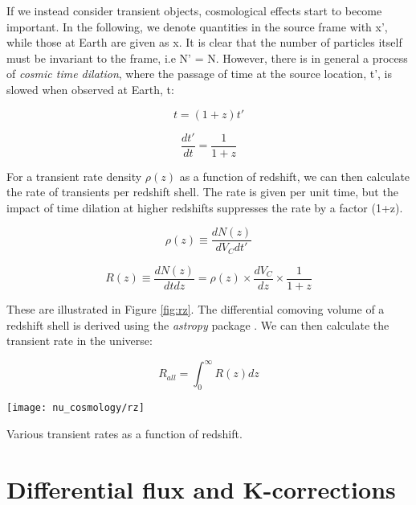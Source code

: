 If we instead consider transient objects, cosmological effects start to become important. In the following, we denote quantities in the source frame with x', while those at Earth are given as x. It is clear that the number of particles itself must be invariant to the frame, i.e N' = N. However, there is in general a process of \emph{cosmic time dilation}, where the passage of time at the source location, t', is slowed when observed at Earth, t:

\begin{equation}
t = (1+z)t'
\label{eq:t}
\end{equation}

\begin{equation}
\frac{dt'}{dt} = \frac{1}{1+z}
\label{eq:dt}
\end{equation}

For a transient rate density $\rho (z)$ as a function of redshift, we can then calculate the rate of transients per redshift shell. The rate is given per unit time, but the impact of time dilation at higher redshifts suppresses the rate by a factor (1+z). 

\begin{equation}
\rho(z) \equiv \frac{dN(z)}{dV_{C}dt'}
\end{equation}

\begin{equation}
R(z) \equiv \frac{dN(z)}{dtdz} = \rho(z) \times \frac{dV_{C}}{dz} \times \frac{1}{1+z}
\label{eq:transient_rate}
\end{equation}

These are illustrated in Figure \ref{fig:rz}. The differential comoving volume of a redshift shell is derived using the \emph{astropy} package . We can then calculate the transient rate in the universe:

\begin{equation}
R_{all} = \int_{0}^{\infty} R(z) dz
\end{equation}

\begin{marginfigure}
	\centering \texttt{[image: nu\_cosmology/rz]}
	\caption{Various transient rates as a function of redshift.}
	\label{fig:rz}
\end{marginfigure}

\section{Differential flux and K-corrections}

